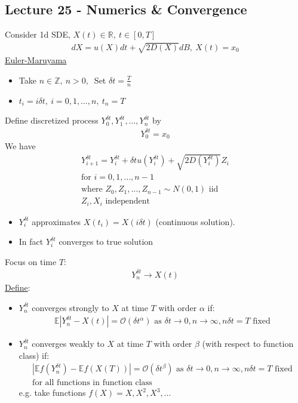 \documentclass[12pt, letterpaper]{article}
\begin{document}
\subsection{Lecture 25 - Numerics \& Convergence}
Consider 1d SDE, $X(t) \in \mathbb{R},\ t\in [0,T]$
\begin{align*}
    dX = u(X)dt + \sqrt{2D(X)} dB,\ X(t) = x_0
\end{align*}
\underline{Euler-Maruyama}
\begin{itemize}
    \item Take $n \in \mathbb{Z},\ n>0,\ $ Set $\delta t = \frac{T}{n}$
    \item $t_i = i\delta t,\ i = 0,1,\dots, n,\ t_n = T$
\end{itemize}
Define discretized process $Y_0^{\delta t}, Y_1^{\delta t},\dots, Y_n^{\delta t}$ by
\begin{align*}
    Y_0^{\delta t} = x_0
\end{align*}
We have 
\begin{align*}
    Y_{i+1}^{\delta t} = Y_i^{\delta t} + \delta t u(Y_i^{\delta t}) + \sqrt{2D(Y_i^{\delta t})}Z_i \\
    \text{for } i = 0,1,\dots, n-1 \\
    \text{where } Z_0, Z_1, \dots, Z_{n-1} \sim N(0,1) \text{ iid} \\
    Z_i, X_i \text{ independent}
\end{align*}
\begin{itemize}
    \item $Y_i^{\delta t}$ approximates $X(t_i) = X(i\delta t)$ (continuous solution).
    \item In fact $Y_i^{\delta t}$ converges to true solution
\end{itemize}
 Focus on time $T$:
\begin{align*}
    Y_n^{\delta t} \rightarrow X(t)
\end{align*}
\underline{Define}:
\begin{itemize}
    \item $Y_n^{\delta t}$ converges strongly to $X$ at time $T$ with order $\alpha$ if:
    \begin{align*}
        \mathbb{E} \left| Y_n^{\delta t} - X(t) \right| = \mathcal{O}(\delta t^\alpha)
        \text{ as } \delta t \rightarrow 0, n \rightarrow \infty, n\delta t = T \text{ fixed}
    \end{align*}
    \item $Y_n^{\delta t}$ converges weakly to $X$ at time $T$ with order $\beta$ 
    (with respect to function class) if:
    \begin{align*}
        \left| \mathbb{E}f(Y_n^{\delta t}) - \mathbb{E}f(X(T)) \right| = \mathcal{O}(\delta t^\beta) 
        \text{ as } \delta t \rightarrow 0, n \rightarrow \infty, n \delta t = T \text{ fixed} \\
        \text{for all functions in function class}
    \end{align*}
    e.g. take functions $f(X) = X,X^2,X^3,\dots$
\end{itemize}
\end{document}
